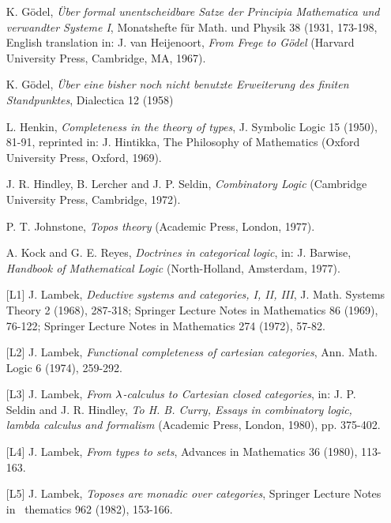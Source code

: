\begin{enumerate}[leftmargin=*, widest=8888, align=left]
\item[] K. G\"odel, {\em \"Uber formal unentscheidbare Satze der Principia Mathematica und
verwandter Systeme I}, Monatshefte f\"ur Math. und Physik 38 (1931, 173-198,
English translation in: J. van Heijenoort, {\em From Frege to G\"odel}
(Harvard University Press, Cambridge, MA, 1967).

\item[] K. G\"odel, {\em \"Uber eine bisher noch nicht benutzte Erweiterung des finiten
Standpunktes}, Dialectica 12 (1958)

\item[] L. Henkin, {\em Completeness in the theory of types}, J. Symbolic Logic 15 (1950),
81-91, reprinted in: J. Hintikka, The Philosophy of Mathematics
(Oxford University Press, Oxford, 1969).

\item[] J. R. Hindley, B. Lercher and J. P. Seldin, {\em Combinatory Logic} (Cambridge
University Press, Cambridge, 1972).

\item[] P. T. Johnstone, {\em Topos theory} (Academic Press, London, 1977).

\item[] A. Kock and G. E. Reyes, {\em Doctrines in categorical logic}, in: J. Barwise,
{\em Handbook of Mathematical Logic} (North-Holland, Amsterdam, 1977).

\item[{[L1]}] J. Lambek, {\em Deductive systems and categories, I, II, III}, J. Math.
Systems Theory 2 (1968), 287-318; Springer Lecture Notes in
Mathematics 86 (1969), 76-122; Springer Lecture Notes in
Mathematics 274 (1972), 57-82.

\item[{[L2]}] J. Lambek, {\em Functional completeness of cartesian categories}, Ann. Math.
Logic 6 (1974), 259-292.

\item[{[L3]}] J. Lambek, {\em From $\lambda$-calculus to Cartesian closed categories}, in: J. P.
Seldin and J. R. Hindley, {\em To H. B. Curry, Essays in combinatory
logic, lambda calculus and formalism} (Academic Press, London,
1980), pp. 375-402.

\item[{[L4]}] J. Lambek, {\em From types to sets}, Advances in Mathematics 36 (1980), 113-163.

\item[{[L5]}] J. Lambek, {\em Toposes are monadic over categories}, Springer Lecture Notes in
~thematics 962 (1982), 153-166.


\end{enumerate}
